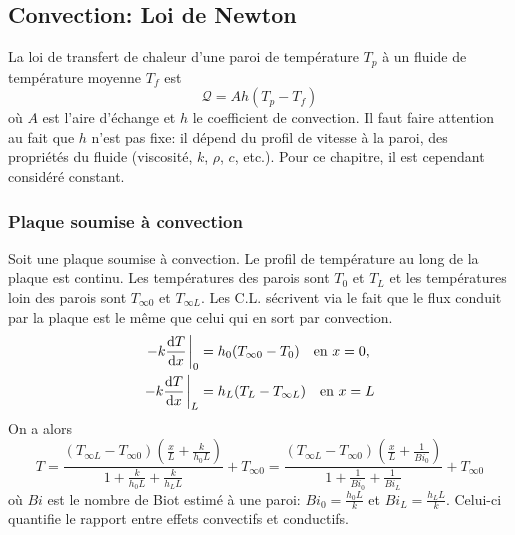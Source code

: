 \documentclass[a4paper,11pt]{report}
\newcommand{\recip}[1]{\frac{1}{#1}}
\begin{document}
    \subsection{Convection: Loi de Newton}
      La loi de transfert de chaleur d'une paroi de température $T_p$ à un fluide de température moyenne $T_f$ est
      \begin{equation}
        \mathcal{Q} = Ah(T_p - T_f)
      \end{equation}
      où $A$ est l'aire d'échange et $h$ le coefficient de convection. Il faut faire attention au fait que $h$ n'est pas fixe: il dépend du profil de vitesse à la paroi, des propriétés du fluide (viscosité, $k$, $\rho$, $c$, etc.). Pour ce chapitre, il est cependant considéré constant.
      \subsubsection{Plaque soumise à convection}
        Soit une plaque soumise à convection. Le profil de température au long de la plaque est continu. Les températures des parois sont $T_0$ et $T_L$ et les températures loin des parois sont $T_{\infty 0}$ et $T_{\infty L}$. Les C.L. sécrivent via le fait que le flux conduit par la plaque est le même que celui qui en sort par convection.
        \begin{equation}
          \begin{aligned}
            -k \dv{T}{x} \eval_0 &= h_0 (T_{\infty 0} - T_0) \quad \textrm{en } x = 0,\\
            -k \dv{T}{x} \eval_L &= h_L (T_{L} - T_{\infty L}) \quad \textrm{en } x = L
          \end{aligned}
        \end{equation}
        On a alors
        \begin{equation}
          T = \frac{(T_{\infty L} - T_{\infty 0})\left(\frac{x}{L} + \frac{k}{h_0 L}\right)}{1 + \frac{k}{h_0 L} + \frac{k}{h_L L}} + T_{\infty 0}
          = \frac{(T_{\infty L} - T_{\infty 0})\left(\frac{x}{L} + \recip{Bi_0}\right)}{1 + \recip{Bi_0} + \recip{Bi_L}} + T_{\infty 0}
        \end{equation}
        où $Bi$ est le nombre de Biot estimé à une paroi: $Bi_0 = \frac{h_0 L}{k}$ et $Bi_L = \frac{h_L L}{k}$. Celui-ci quantifie le rapport entre effets convectifs et conductifs.
\end{document}
